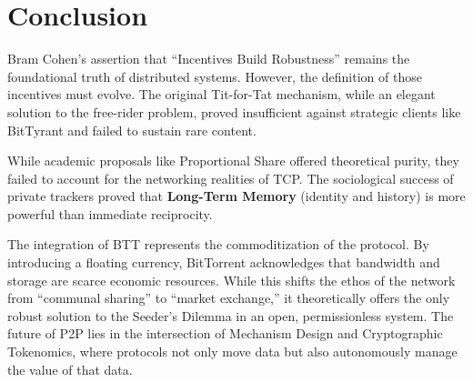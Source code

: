 \documentclass[12pt]{article}
\begin{document}
\section{Conclusion}

Bram Cohen's assertion that ``Incentives Build Robustness'' remains the foundational truth of distributed systems. However, the definition of those incentives must evolve. The original Tit-for-Tat mechanism, while an elegant solution to the free-rider problem, proved insufficient against strategic clients like BitTyrant and failed to sustain rare content.

While academic proposals like Proportional Share offered theoretical purity, they failed to account for the networking realities of TCP. The sociological success of private trackers proved that \textbf{Long-Term Memory} (identity and history) is more powerful than immediate reciprocity.

The integration of BTT represents the commoditization of the protocol. By introducing a floating currency, BitTorrent acknowledges that bandwidth and storage are scarce economic resources. While this shifts the ethos of the network from ``communal sharing'' to ``market exchange,'' it theoretically offers the only robust solution to the Seeder's Dilemma in an open, permissionless system. The future of P2P lies in the intersection of Mechanism Design and Cryptographic Tokenomics, where protocols not only move data but also autonomously manage the value of that data.
\end{document}
